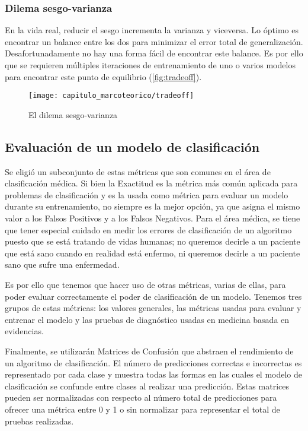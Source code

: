 
\subsubsection{Dilema sesgo-varianza}

En la vida real, reducir el sesgo incrementa la varianza y viceversa. Lo óptimo
es encontrar un balance entre los dos para minimizar el error total de
generalización. Desafortunadamente no hay una forma fácil de encontrar este
balance. Es por ello que se requieren múltiples iteraciones de entrenamiento de
uno o varios modelos para encontrar este punto de equilibrio
(\autoref{fig:tradeoff})\cite{F}.

\begin{figure}[H]
    \centering
    \texttt{[image: capitulo\_marcoteorico/tradeoff]}
    \caption{El dilema sesgo-varianza}\label{fig:tradeoff}
\end{figure}

\subsection{Evaluación de un modelo de clasificación}

Se eligió un subconjunto de estas métricas que son comunes en el área de
clasificación médica. Si bien la Exactitud es la métrica más común
aplicada para problemas de clasificación y es la usada como métrica para evaluar
un modelo durante su entrenamiento, no siempre es la mejor opción, ya que asigna
el mismo valor a los Falsos Positivos y a los Falsos Negativos. Para el área
médica, se tiene que tener especial cuidado en medir los errores de
clasificación de un algoritmo puesto que se está tratando de vidas humanas; no
queremos decirle a un paciente que está sano cuando en realidad está enfermo, ni
queremos decirle a un paciente sano que sufre una enfermedad.

Es por ello que tenemos que hacer uso de otras métricas, varias de ellas, para
poder evaluar correctamente el poder de clasificación de un modelo. Tenemos tres
grupos de estas métricas: los valores generales, las métricas usadas para
evaluar y entrenar el modelo y las pruebas de diagnóstico usadas en medicina
basada en evidencias.

Finalmente, se utilizarán Matrices de Confusión que abstraen el rendimiento de
un algoritmo de clasificación. El número de predicciones correctas e incorrectas
es representado por cada clase y muestra todas las formas en las cuales el
modelo de clasificación se confunde entre clases al realizar una predicción.
Estas matrices pueden ser normalizadas con respecto al número total de
predicciones para ofrecer una métrica entre 0 y 1 o sin normalizar para
representar el total de pruebas realizadas.

